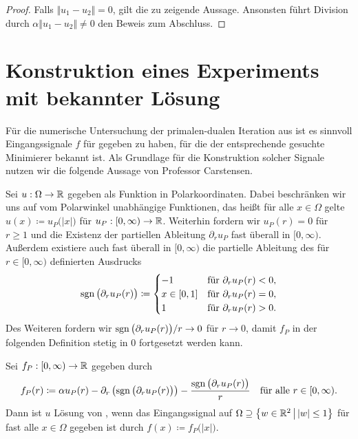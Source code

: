 \begin{proof}
  Falls $\Vert u_1 - u_2 \Vert = 0$, gilt die zu zeigende Aussage.
  Ansonsten führt Division durch $\alpha\Vert u_1 - u_2 \Vert\neq 0$ den
  Beweis zum Abschluss.
\end{proof}

\section{Konstruktion eines Experiments mit bekannter Lösung}
\label{sec:constructionInputSignal}

Für die numerische Untersuchung der primalen-dualen Iteration aus
 ist es sinnvoll
Eingangssignale $f$ für  gegeben zu haben, für die
der entsprechende gesuchte Minimierer bekannt ist. 
Als Grundlage für die Konstruktion solcher Signale nutzen wir die folgende 
Aussage von Professor Carstensen.

Sei $u:\Omega\to\mathbb{R}$ gegeben als Funktion in Polarkoordinaten. 
Dabei beschränken wir uns auf vom Polarwinkel unabhängige Funktionen, das heißt
für alle $x\in\Omega$ gelte
$u(x)\coloneqq u_P\big(|x|\big)$ für $u_P:[0,\infty)\to\mathbb{R}$. 
Weiterhin fordern wir $u_P(r)=0$ für $r\geq 1$ und die Existenz
der partiellen Ableitung $\partial_r u_P$ fast überall in $[0,\infty)$.
Außerdem existiere auch fast überall in $[0,\infty)$ die partielle Ableitung
des für $r\in[0,\infty)$ definierten Ausdrucks
\begin{align*}
  \operatorname{sgn}\big(\partial_r u_P(r)\big)
  \coloneqq
  \begin{cases}
    -1 &\text{für }\partial_r u_P(r)<0,\\
    x\in[0,1] &\text{für }\partial_r u_P(r)=0,\\ 
    1 &\text{für }\partial_r u_P(r)>0.
  \end{cases}
\end{align*}
Des Weiteren fordern wir $\operatorname{sgn}\big(\partial_r u_P(r)\big)/r\to 0$ für $r\to 0$, 
damit $f_P$ in der folgenden Definition stetig in $0$ fortgesetzt werden kann.

Sei $f_P:[0,\infty)\to\mathbb{R}$ gegeben durch
\begin{align}
  \label{eq:constructionInputSignal}
  f_P(r)
  \coloneqq 
  \alpha u_P(r) - \partial_r\left(\operatorname{sgn}\big(\partial_r u_P(r)\big)\right) 
  - \frac{\operatorname{sgn}\big(\partial_r u_P(r)\big)}{r}
  \quad\text{für alle }r\in[0,\infty).
\end{align}
Dann ist $u$ Lösung von , wenn das Eingangssignal
auf $\Omega\supseteq \left\{w\in\mathbb{R}^2\,\middle|\, |w|\leq 1\right\}$ für fast
alle $x\in\Omega$ gegeben ist durch $f(x)\coloneqq f_P\big(|x|\big)$.

